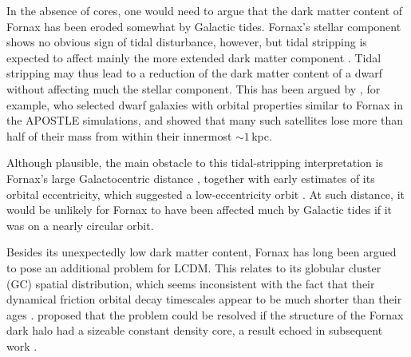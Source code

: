 \documentclass[fleqn,usenatbib]{mnras}
\begin{document}
In the absence of cores, one would need to argue that the dark matter content of Fornax has been eroded somewhat by Galactic tides. Fornax's stellar component shows no obvious sign of tidal disturbance, however, but tidal stripping is expected to affect mainly the more extended dark matter component \citep[see; e.g.,][]{Penarrubia08}. Tidal stripping may thus lead to a reduction of the dark matter content of a dwarf without affecting much the stellar component. This has been argued by \citet{Genina2020}, for example, who selected dwarf galaxies with orbital properties similar to Fornax in the APOSTLE simulations, and showed that many such satellites lose more than half of their mass from within their innermost $\sim 1$\,kpc.

Although plausible, the main obstacle to this tidal-stripping interpretation is Fornax's large Galactocentric distance \citep[$\sim 149$\,kpc][]{Pietrzynski2009}, together with early estimates of its orbital eccentricity, which suggested a low-eccentricity orbit \citep[see; e.g.,][and references therein]{Piatek2002,Dinescu2004,Battaglia2015}. At such distance, it would be unlikely for Fornax to have been affected much by Galactic tides if it was on a nearly circular orbit.

Besides its unexpectedly low dark matter content, Fornax has long been argued to pose an additional problem for LCDM. This relates to its globular cluster (GC) spatial distribution, which seems inconsistent with the fact that their dynamical friction orbital decay timescales appear to be much shorter than their ages \citep{Tremaine1976,Hernandez1998}. \citet{Goerdt2006} proposed that the problem could be resolved if the structure of the Fornax dark halo had a sizeable constant density core, a result echoed in subsequent work \citep[see; e.g.,][]{Read2006,Cole2012,Petts2015}.
\end{document}
